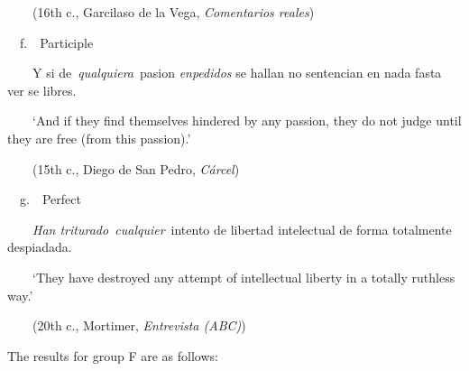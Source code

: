\begin{styleStandard}
\ \ \ \ (16th c.,\textit{ }Garcilaso de la Vega,\textit{ Comentarios reales})
\end{styleStandard}

\begin{styleStandard}
\ \ f.\ \ Participle
\end{styleStandard}

\begin{styleStandard}
\ \ \ \ Y si de~\textit{qualquiera}~pasion \textit{enpedidos} se hallan no sentencian en nada fasta ver se libres. 
\end{styleStandard}

\begin{styleStandard}
\ \ \ \ ‘And if they find themselves hindered by any passion, they do not judge until they are free (from this passion).’
\end{styleStandard}

\begin{styleStandard}
\ \ \ \ (15th c., Diego de San Pedro,\textit{ Cárcel})
\end{styleStandard}

\begin{styleStandard}
\ \ g.\ \ Perfect
\end{styleStandard}

\begin{styleStandard}
\ \ \ \ \textit{Han triturado~cualquier}~intento de libertad intelectual de forma totalmente despiadada. 
\end{styleStandard}

\begin{styleStandard}
\ \ \ \ ‘They have destroyed any attempt of intellectual liberty in a totally ruthless way.’
\end{styleStandard}

\begin{styleStandard}
\ \ \ \ (20th c., Mortimer,\textit{ Entrevista (ABC)})
\end{styleStandard}

\begin{styleStandard}
The results for group F are as follows:
\end{styleStandard}

